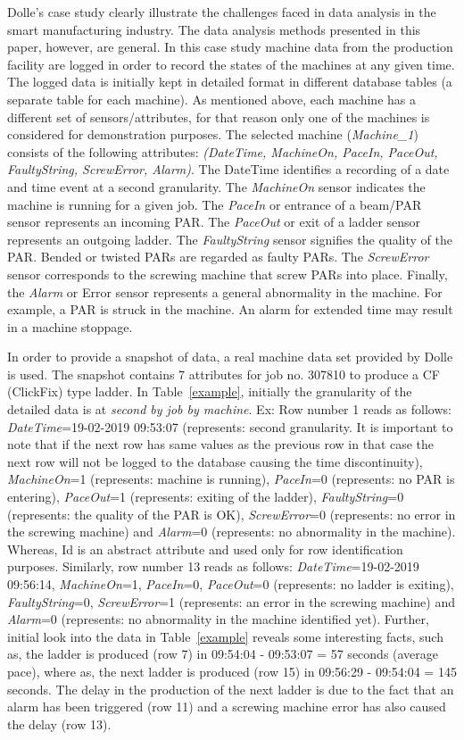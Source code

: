 \documentclass[runningheads]{llncs}
\begin{document}
Dolle's case study clearly illustrate the challenges faced in data analysis in the smart manufacturing industry. The data analysis methods presented in this paper, however, are general. In this case study machine data from the production facility are logged in order to record the states of the machines at any given time. The logged data is initially kept in detailed format in different database tables (a separate table for each machine). As mentioned above, each machine has a different set of sensors/attributes, for that reason only one of the machines is considered for demonstration purposes. The selected machine (\emph{Machine\_1}) consists of the following attributes: \emph{(DateTime, MachineOn, PaceIn, PaceOut, FaultyString, ScrewError, Alarm)}. The DateTime identifies a recording of a date and time event at a second granularity. The \emph{MachineOn} sensor indicates the machine is running for a given job. The \emph{PaceIn} or entrance of a beam/PAR sensor represents an incoming PAR. The \emph{PaceOut} or exit of a ladder sensor represents an outgoing ladder. The \emph{FaultyString} sensor signifies the quality of the PAR. Bended or twisted PARs are regarded as faulty PARs. The \emph{ScrewError} sensor corresponds to the screwing machine that screw PARs into place. Finally, the \emph{Alarm} or Error sensor represents a general abnormality in the machine. For example, a PAR is struck in the machine. An alarm for extended time may result in a  machine stoppage.

In order to provide a snapshot of data, a real machine data set provided by Dolle is used. The snapshot contains 7 attributes for job no. 307810 to produce a CF (ClickFix) type ladder. In Table~\ref{example}, initially the granularity of the detailed data is at \emph{second by job by machine}. Ex: Row number 1 reads as follows: \emph{DateTime}=19-02-2019 09:53:07 (represents: second granularity. It is important to note that if the next row has same values as the previous row in that case the next row will not be logged to the database causing the time discontinuity), \emph{MachineOn}=1 (represents: machine is running), \emph{PaceIn}=0 (represents: no PAR is entering), \emph{PaceOut}=1 (represents: exiting of the ladder), \emph{FaultyString}=0 (represents: the quality of the PAR is OK), \emph{ScrewError}=0 (represents: no error in the screwing machine) and \emph{Alarm}=0 (represents: no abnormality in the machine). Whereas, Id is an abstract attribute and used only for row identification purposes. Similarly, row number 13 reads as follows: \emph{DateTime}=19-02-2019 09:56:14, \emph{MachineOn}=1, \emph{PaceIn}=0, \emph{PaceOut}=0 (represents: no ladder is exiting), \emph{FaultyString}=0, \emph{ScrewError}=1 (represents: an error in the screwing machine) and \emph{Alarm}=0 (represents: no abnormality in the machine identified yet). Further, initial look into the data in Table~\ref{example} reveals some interesting facts, such as, the ladder is produced (row 7) in 09:54:04 - 09:53:07 = 57 seconds (average pace), where as, the next ladder is produced (row 15) in 09:56:29 - 09:54:04 = 145 seconds. The delay in the production of the next ladder is due to the fact that an alarm has been triggered (row 11) and a screwing machine error has also caused the delay (row 13). 
\end{document}
